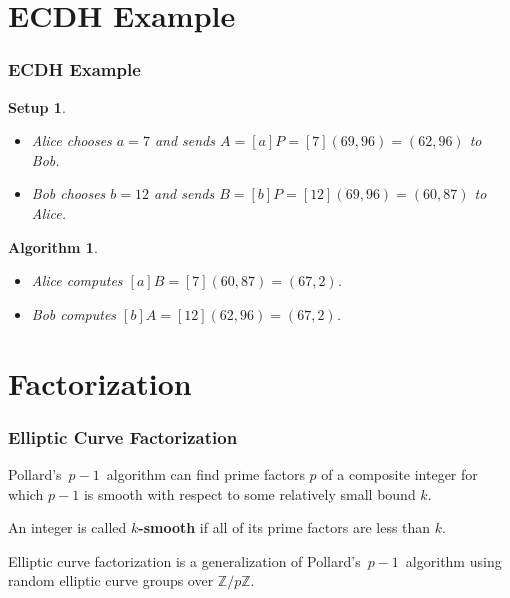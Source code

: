\documentclass{beamer}
\newtheorem{algorithm}{Algorithm}
\newtheorem{setup}{Setup}
\newcommand{\zmod}[1]{\ensuremath{\mathbb{Z}/#1\mathbb{Z}}}
\begin{document}
    \section{ECDH Example}
    \begin{frame}
        \frametitle{ECDH Example}
        \begin{setup}
            \begin{itemize}
                \item Alice chooses \(a = 7\) and sends \(A = [a]P =
                    [7](69, 96) = (62, 96)\) to Bob.
                \item Bob chooses \(b = 12\) and sends \(B = [b]P =
                    [12](69, 96) = (60, 87)\) to Alice.
            \end{itemize}
        \end{setup}
        \vfill
        \begin{algorithm}
            \begin{itemize}
                \item Alice computes \([a]B = [7](60, 87) = (67, 2)\).
                \item Bob computes \([b]A = [12](62, 96) = (67, 2)\).
            \end{itemize}
        \end{algorithm}
    \end{frame}

    \section{Factorization}
    \begin{frame}
        \frametitle{Elliptic Curve Factorization}
        Pollard's~\(p - 1\)~algorithm can find prime factors \(p\) of a
        composite integer for which \(p - 1\) is smooth with respect to some
        relatively small bound \(k\).
        \vfill
        \begin{definition}
            An integer is called \textbf{\(k\)-smooth} if all of its prime
            factors are less than \(k\).
            \end{definition}
            \vfill
            Elliptic curve factorization is a generalization of
            Pollard's~\(p - 1\)~algorithm using random elliptic curve groups
            over \zmod{p}.
            \end{frame}
\end{document}
